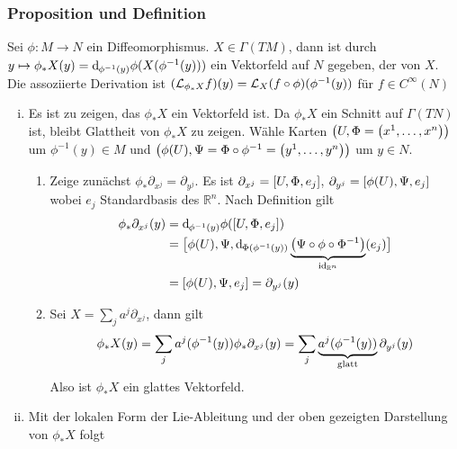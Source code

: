 \subsubsection[Proposition und Definition: Push-Forward]{Proposition und Definition}
\label{ssub:163}
Sei $\phi:M\to N$ ein Diffeomorphismus. $X\in \Gamma(TM)$, dann ist durch $y\mapsto \phi_{*} X(y) = \mathd_{\phi^{-1}(y)} \phi\enbrace{X(\phi^{-1}(y))}$ ein Vektorfeld auf $N$ gegeben, der  von $X$. Die assoziierte Derivation ist $\enbrace{\mathcal{L}_{\phi_* X} f}(y) = \mathcal{L}_X (f\circ \phi)(\phi^{-1}(y))$ für $f\in C^\infty (N)$
\begin{enumerate}[(i)]
\item Es ist zu zeigen, das $\phi_* X$ ein Vektorfeld ist. Da $\phi_* X$ ein Schnitt auf $\Gamma(TN)$ ist, bleibt Glattheit von $\phi_* X$ zu zeigen. Wähle Karten $\enbrace*{U, \Phi = \enbrace*{x^1,\ldots,x^n}}$ um $\phi^{-1}(y)\in M$ und $\enbrace*{\phi(U),\Psi = \Phi \circ \phi^{-1} = \enbrace*{y^1,\ldots,y^n}}$ um $y\in N$.
\begin{enumerate}[Step 1:]
\item Zeige zunächst $\phi_* \partial_{x^j} = \partial_{y^j}$. Es ist $\partial_{x^j} = \benbrace{U,\Phi,e_j}$, $\partial_{y^j} = \benbrace{\phi(U),\Psi,e_j}$ wobei $e_j$ Standardbasis des $\mathds{R}^n$. Nach Definition gilt
\begin{align*}
\phi_* \partial_{x^j}\enbrace*{y} &= \mathd_{\phi^{-1} (y)} \phi\enbrace*{\benbrace*{U,\Phi,e_j}}\\
&= \benbrace[\big]{\phi(U),\Psi, \mathd_{\Phi\enbrace*{\phi^{-1}(y)}} \underbrace{\enbrace*{\Psi \circ \phi \circ \Phi^{-1}}}_{\id_{\mathds{R}^n}}(e_j)}\\
&= \benbrace{\phi(U),\Psi,e_j} = \partial_{y^j}(y)
\end{align*}
\item Sei $X = \sum_j a^j \partial_{x^j}$, dann gilt
\[
\phi_* X(y) = \sum_j a^j(\phi^{-1}(y))\phi_* \partial_{x^j}(y) = \sum_j \underbrace{a^j\enbrace{\phi^{-1}(y)}}_{\text{glatt}} \partial_{y^j} (y)
\]
Also ist $\phi_* X$ ein glattes Vektorfeld.
\end{enumerate}
\item Mit der lokalen Form der Lie-Ableitung und der oben gezeigten Darstellung von $\phi_* X$ folgt
\[
\]
\end{enumerate}

